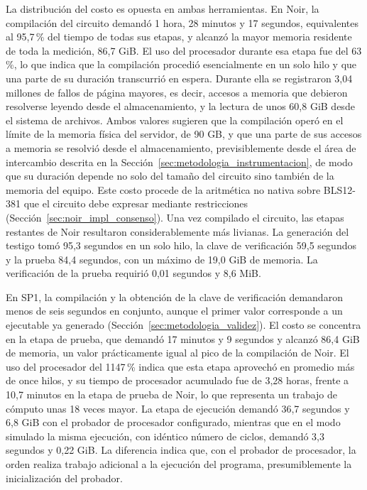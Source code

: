 La distribución del costo es opuesta en ambas herramientas. En Noir, la compilación del circuito
demandó 1 hora, 28 minutos y 17 segundos, equivalentes al 95,7\,\% del tiempo de todas sus etapas,
y alcanzó la mayor memoria residente de toda la medición, 86,7 GiB. El uso del procesador durante
esa etapa fue del 63\,\%, lo que indica que la compilación procedió esencialmente en un solo hilo y
que una parte de su duración transcurrió en espera. Durante ella se registraron 3,04 millones de
fallos de página mayores, es decir, accesos a memoria que debieron resolverse leyendo desde el
almacenamiento, y la lectura de unos 60,8 GiB desde el sistema de archivos. Ambos valores sugieren
que la compilación operó en el límite de la memoria física del servidor, de 90 GB, y que una parte
de sus accesos a memoria se resolvió desde el almacenamiento, previsiblemente desde el área de
intercambio descrita en la Sección~\ref{sec:metodologia_instrumentacion}, de modo que su duración
depende no solo del tamaño del circuito sino también de la memoria del equipo. Este costo procede de la
aritmética no nativa sobre BLS12-381 que el circuito debe expresar mediante restricciones
(Sección~\ref{sec:noir_impl_consenso}). Una vez compilado el circuito, las etapas restantes de Noir
resultaron considerablemente más livianas. La generación del testigo tomó 95,3 segundos en un solo
hilo, la clave de verificación 59,5 segundos y la prueba 84,4 segundos, con un máximo de 19,0 GiB
de memoria. La verificación de la prueba requirió 0,01 segundos y 8,6 MiB.

En SP1, la compilación y la obtención de la clave de verificación demandaron menos de seis
segundos en conjunto, aunque el primer valor corresponde a un ejecutable ya generado
(Sección~\ref{sec:metodologia_validez}). El costo se concentra en la etapa de prueba, que demandó
17 minutos y 9 segundos y alcanzó 86,4 GiB de memoria, un valor prácticamente igual al pico de la
compilación de Noir. El uso del procesador del 1147\,\% indica que esta etapa aprovechó en promedio
más de once hilos, y su tiempo de procesador acumulado fue de 3,28 horas, frente a 10,7 minutos en
la etapa de prueba de Noir, lo que representa un trabajo de cómputo unas 18 veces mayor. La etapa de
ejecución demandó 36,7 segundos y 6,8 GiB con el probador de procesador configurado, mientras que
en el modo simulado la misma ejecución, con idéntico número de ciclos, demandó 3,3 segundos y
0,22 GiB. La diferencia indica que, con el probador de procesador, la orden realiza trabajo
adicional a la ejecución del programa, presumiblemente la inicialización del probador.

